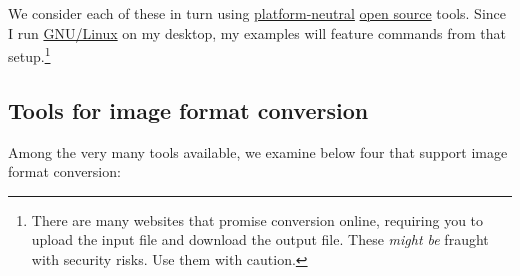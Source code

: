 \documentclass[
  11pt,
  british,
  a4paper,
]{article}
\begin{document}
We consider each of these in turn using
\href{https://itlaw.wikia.org/wiki/Platform_neutral}{platform-neutral}
\href{https://opensource.com/resources/what-open-source}{open source}
tools. Since I run
\href{https://en.wikipedia.org/wiki/GNU/Linux_naming_controversy}{GNU/Linux}
on my desktop, my examples will feature commands from that
setup.\footnote{There are many websites that promise conversion online,
  requiring you to upload the input file and download the output file.
  These \emph{might be} fraught with security risks. Use them with
  caution.}

\hypertarget{tools-for-image-format-conversion}{%
\subsection{Tools for image format
conversion}\label{tools-for-image-format-conversion}}

Among the very many tools available, we examine below four that support
image format conversion:
\end{document}
